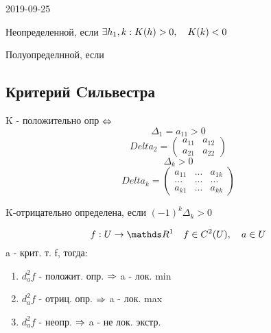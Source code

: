 \documentclass[main]{subfiles}
\begin{document}
\begin{lect} {2019-09-25}
\begin{Definition}
				Неопределенной, если $\exists h_1,k: K(h)>0,\quad K(k)<0$

				Полуопределнной, если
		\end{Definition}

		\subsection{Критерий Cильвестра}
		K - положительно опр $\Leftrightarrow$
		\[\Delta_1=a_{1 1}>0\]
		\[Delta_2=\begin{pmatrix} %
				a_{11} & a_{12}\\
				a_{21} & a_{22}
		\end{pmatrix}\]
		\[\Delta_k>0\]
		\[Delta_k=\begin{pmatrix}
				a_{11} & ... & a_{1k}\\
				...& ... & ... \\
				a_{k1} &...& a_{kk}
		\end{pmatrix}\]

		K-отрицательно определена, если $(-1)^k \Delta_k>0$

		\begin{Theorem}
				\[f: U \ra \R^1 \q f \in C^2(U), \q a \in U\]
				a - крит. т. f, тогда:
				\begin{enumerate}
						\item $d_a^2 f$ - положит. опр. $\Rightarrow$ a - лок. min
						\item $d_a^2 f$ - отриц. опр. $\Rightarrow$ a - лок. max
						\item $d_a^2 f$ - неопр. $\Rightarrow$ a - не лок. экстр.
				\end{enumerate}
		\end{Theorem}

		\end{lect}
\end{document}
